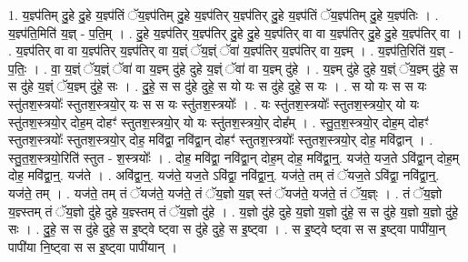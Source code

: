\documentclass[17pt]{extarticle}
\begin{document}
1. य॒ज्ञ्प॑तिम् दु॒हे दु॒हे य॒ज्ञ्प॑तिं ॅय॒ज्ञ्प॑तिम् दु॒हे य॒ज्ञ्प॑तिर् य॒ज्ञ्प॑तिर् दु॒हे य॒ज्ञ्प॑तिं ॅय॒ज्ञ्प॑तिम् दु॒हे य॒ज्ञ्प॑तिः । . य॒ज्ञ्प॑ति॒मिति॑ य॒ज्ञ् - प॒ति॒म् । . दु॒हे य॒ज्ञ्प॑तिर् य॒ज्ञ्प॑तिर् दु॒हे दु॒हे य॒ज्ञ्प॑तिर् वा वा य॒ज्ञ्प॑तिर् दु॒हे दु॒हे य॒ज्ञ्प॑तिर् वा । . य॒ज्ञ्प॑तिर् वा वा य॒ज्ञ्प॑तिर् य॒ज्ञ्प॑तिर् वा य॒ज्ञ्ं ॅय॒ज्ञ्ं ॅवा॑ य॒ज्ञ्प॑तिर् य॒ज्ञ्प॑तिर् वा य॒ज्ञ्म् । . य॒ज्ञ्प॑ति॒रिति॑ य॒ज्ञ् - प॒तिः॒ । . वा॒ य॒ज्ञ्ं ॅय॒ज्ञ्ं ॅवा॑ वा य॒ज्ञ्म् दु॑हे दुहे य॒ज्ञ्ं ॅवा॑ वा य॒ज्ञ्म् दु॑हे । . य॒ज्ञ्म् दु॑हे दुहे य॒ज्ञ्ं ॅय॒ज्ञ्म् दु॑हे॒ स स दु॑हे य॒ज्ञ्ं ॅय॒ज्ञ्म् दु॑हे॒ सः । . दु॒हे॒ स स दु॑हे दुहे॒ स यो यः स दु॑हे दुहे॒ स यः । . स यो यः स स यः स्तु॑तश॒स्त्रयोः᳚ स्तुतश॒स्त्रयो॒र् यः स स यः स्तु॑तश॒स्त्रयोः᳚ । . यः स्तु॑तश॒स्त्रयोः᳚ स्तुतश॒स्त्रयो॒र् यो यः स्तु॑तश॒स्त्रयो॒र् दोह॒म् दोहꣳ॑ स्तुतश॒स्त्रयो॒र् यो यः स्तु॑तश॒स्त्रयो॒र् दोह᳚म् । . स्तु॒त॒श॒स्त्रयो॒र् दोह॒म् दोहꣳ॑ स्तुतश॒स्त्रयोः᳚ स्तुतश॒स्त्रयो॒र् दोह॒ मवि॑द्वा॒ नवि॑द्वा॒न् दोहꣳ॑ स्तुतश॒स्त्रयोः᳚ स्तुतश॒स्त्रयो॒र् दोह॒ मवि॑द्वान् । . स्तु॒त॒श॒स्त्रयो॒रिति॑ स्तुत - श॒स्त्रयोः᳚ । . दोह॒ मवि॑द्वा॒ नवि॑द्वा॒न् दोह॒म् दोह॒ मवि॑द्वा॒न्॒. यज॑ते॒ यज॒ते ऽवि॑द्वा॒न् दोह॒म् दोह॒ मवि॑द्वा॒न्॒. यज॑ते । . अवि॑द्वा॒न्॒. यज॑ते॒ यज॒ते ऽवि॑द्वा॒ नवि॑द्वा॒न्॒. यज॑ते॒ तम् तं ॅयज॒ते ऽवि॑द्वा॒ नवि॑द्वा॒न्॒. यज॑ते॒ तम् । . यज॑ते॒ तम् तं ॅयज॑ते॒ यज॑ते॒ तं ॅय॒ज्ञो य॒ज्ञ् स्तं ॅयज॑ते॒ यज॑ते॒ तं ॅय॒ज्ञ्ः । . तं ॅय॒ज्ञो य॒ज्ञ्स्तम् तं ॅय॒ज्ञो दु॑हे दुहे य॒ज्ञ्स्तम् तं ॅय॒ज्ञो दु॑हे । . य॒ज्ञो दु॑हे दुहे य॒ज्ञो य॒ज्ञो दु॑हे॒ स स दु॑हे य॒ज्ञो य॒ज्ञो दु॑हे॒ सः । . दु॒हे॒ स स दु॑हे दुहे॒ स इ॒ष्ट्वे ष्ट्वा स दु॑हे दुहे॒ स इ॒ष्ट्वा । . स इ॒ष्ट्वे ष्ट्वा स स इ॒ष्ट्वा पापी॑या॒न् पापी॑या नि॒ष्ट्वा स स इ॒ष्ट्वा पापी॑यान् । \newline
\end{document}
